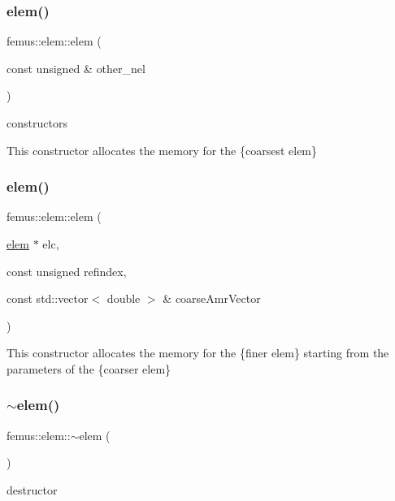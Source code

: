 \subsubsection{\texorpdfstring{elem()}{elem()}\hspace{0.1cm}{\footnotesize\ttfamily [1/2]}}
{\footnotesize\ttfamily femus\+::elem\+::elem (\begin{DoxyParamCaption}\item[{const unsigned \&}]{other\+\_\+nel }\end{DoxyParamCaption})}

constructors

This constructor allocates the memory for the \{coarsest elem\} \mbox{\label{classfemus_1_1elem_accb87238cdfe0417be67692c152f38bd}} 
\subsubsection{\texorpdfstring{elem()}{elem()}\hspace{0.1cm}{\footnotesize\ttfamily [2/2]}}
{\footnotesize\ttfamily femus\+::elem\+::elem (\begin{DoxyParamCaption}\item[{\mbox{\hyperlink{classfemus_1_1elem}{elem}} $\ast$}]{elc,  }\item[{const unsigned}]{refindex,  }\item[{const std\+::vector$<$ double $>$ \&}]{coarse\+Amr\+Vector }\end{DoxyParamCaption})}

This constructor allocates the memory for the \{finer elem\} starting from the parameters of the \{coarser elem\} \mbox{\label{classfemus_1_1elem_ae1e94fa2475ed9a86fa504592cd59b98}} 
\subsubsection{\texorpdfstring{$\sim$elem()}{~elem()}}
{\footnotesize\ttfamily femus\+::elem\+::$\sim$elem (\begin{DoxyParamCaption}{ }\end{DoxyParamCaption})}

destructor 

